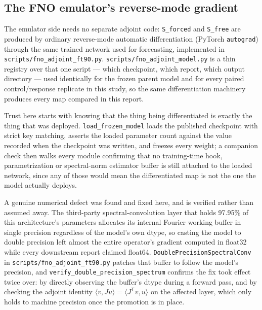 \documentclass[3p,12pt]{elsarticle}
\newcommand{\FNO}{FNO}
\begin{document}
\subsection{The \FNO{} emulator's reverse-mode gradient}
\label{app:trust-fno}

The emulator side needs no separate adjoint code: \texttt{S\_forced} and
\texttt{S\_free} are produced by ordinary reverse-mode automatic
differentiation (PyTorch \texttt{autograd}) through the same trained network
used for forecasting, implemented in \texttt{scripts/fno\_adjoint\_ft90.py}.
\texttt{scripts/fno\_adjoint\_model.py} is a thin registry over that one
script --- which checkpoint, which report, which output directory --- used
identically for the frozen parent model and for every paired control/response
replicate in this study, so the same differentiation machinery produces every
map compared in this report.

Trust here starts with knowing that the thing being differentiated is exactly
the thing that was deployed. \texttt{load\_frozen\_model} loads the published
checkpoint with strict key matching, asserts the loaded parameter count
against the value recorded when the checkpoint was written, and freezes every
weight; a companion check then walks every module confirming that no
training-time hook, parametrization or spectral-norm estimator buffer is
still attached to the loaded network, since any of those would mean the
differentiated map is not the one the model actually deploys.

A genuine numerical defect was found and fixed here, and is verified rather
than assumed away. The third-party spectral-convolution layer that holds
97.95\% of this architecture's parameters allocates its internal Fourier
working buffer in single precision regardless of the model's own dtype, so
casting the model to double precision left almost the entire operator's
gradient computed in float32 while every downstream report claimed float64.
\texttt{DoublePrecisionSpectralConv} in
\texttt{scripts/fno\_adjoint\_ft90.py} patches that buffer to follow the
model's precision, and \texttt{verify\_double\_precision\_spectrum} confirms
the fix took effect twice over: by directly observing the buffer's dtype
during a forward pass, and by checking the adjoint identity
$\langle v,Ju\rangle=\langle J^{\mathsf T}v,u\rangle$ on the affected layer,
which only holds to machine precision once the promotion is in place.
\end{document}

